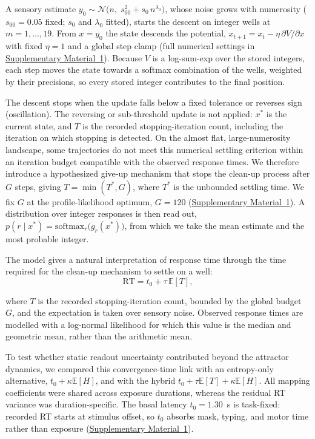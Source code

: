 \documentclass[Afour,sageh,times]{sagej}
\begin{document}
A sensory estimate $y_0 \sim \mathcal{N}\!\big(n,\; s_{00}^2 + s_{0}\,n^{\lambda_0}\big)$, whose noise grows with numerosity ($s_{00}=0.05$ fixed; $s_0$ and $\lambda_0$ fitted), starts the descent on integer wells at $m=1,\ldots,19$. From $x = y_0$ the state descends the potential, $x_{t+1} = x_t - \eta\,\partial V/\partial x$ with fixed $\eta=1$ and a global step clamp (full numerical settings in \hyperref[sup-sm:methods]{Supplementary Material~1}). Because $V$ is a log-sum-exp over the stored integers, each step moves the state towards a softmax combination of the wells, weighted by their precisions, so every stored integer contributes to the final position.

The descent stops when the update falls below a fixed tolerance or reverses sign (oscillation). The reversing or sub-threshold update is not applied: $x^*$ is the current state, and $T$ is the recorded stopping-iteration count, including the iteration on which stopping is detected. On the almost flat, large-numerosity landscape, some trajectories do not meet this numerical settling criterion within an iteration budget compatible with the observed response times. We therefore introduce a hypothesized give-up mechanism that stops the clean-up process after $G$ steps, giving $T = \min(T^{*},G)$, where $T^{*}$ is the unbounded settling time. We fix $G$ at the profile-likelihood optimum, $G=120$ (\hyperref[sup-sm:methods]{Supplementary Material~1}). A distribution over integer responses is then read out, $p(r \mid x^*) = \mathrm{softmax}_{r}\!\big(g_r(x^*)\big)$, from which we take the mean estimate and the most probable integer.

The model gives a natural interpretation of response time through the time required for the clean-up mechanism to settle on a well:
%
\begin{equation}\label{eq:rt}
\mathrm{RT} = t_{0} + \tau\,\mathbb{E}[T],
\end{equation}

where $T$ is the recorded stopping-iteration count, bounded by the global budget $G$, and the expectation is taken over sensory noise. Observed response times are modelled with a log-normal likelihood for which this value is the median and geometric mean, rather than the arithmetic mean.

To test whether static readout uncertainty contributed beyond the attractor dynamics, we compared this convergence-time link
with an entropy-only alternative, $t_0+\kappa\mathbb{E}[H]$, and with the hybrid $t_0+\tau\mathbb{E}[T]+\kappa\mathbb{E}[H]$. All mapping coefficients were shared across exposure durations, whereas the residual RT variance was duration-specific. The basal latency $t_0=1.30$~s is task-fixed: recorded RT starts at stimulus offset, so $t_0$ absorbs mask, typing, and motor time rather than exposure (\hyperref[sup-sm:methods]{Supplementary Material~1}).
\end{document}
